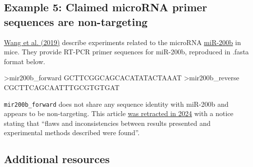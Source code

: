 \documentclass[letterpaper, 12pt]{article}
\begin{document}
\subsection*{Example 5: Claimed microRNA primer sequences are non-targeting}

\href{https://doi.org/10.1002/jcb.28599}{Wang et al. (2019)} describe experiments related to the microRNA \href{https://www.ncbi.nlm.nih.gov/gene/387243}{miR-200b} in mice. They provide RT-PCR primer sequences for miR-200b, reproduced in .fasta format below.

\begin{verbatim*}
>mir200b_forward
GCTTCGGCAGCACATATACTAAAT
>mir200b_reverse
CGCTTCAGCAATTTGCGTGTGAT
\end{verbatim*}

\verb|mir200b_forward| does not share any sequence identity with miR-200b and appears to be non-targeting. This article \href{https://doi.org/10.1002/jcb.30555}{was retracted in 2024} with a notice stating that ``flaws and inconsistencies between results presented and experimental methods described were found''.

\subsection*{Additional resources}
\end{document}
